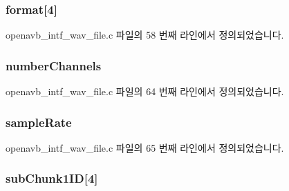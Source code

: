 \subsubsection[{\texorpdfstring{format}{format}}]{ format\mbox{[}4\mbox{]}}\hypertarget{structwav__file__header__t_ab12e770013967c7551505247b1a1fb47}{}\label{structwav__file__header__t_ab12e770013967c7551505247b1a1fb47}


openavb\+\_\+intf\+\_\+wav\+\_\+file.\+c 파일의 58 번째 라인에서 정의되었습니다.

\subsubsection[{\texorpdfstring{number\+Channels}{numberChannels}}]{ number\+Channels}\hypertarget{structwav__file__header__t_a5d53f987f62115b9a280f51b3eb6e518}{}\label{structwav__file__header__t_a5d53f987f62115b9a280f51b3eb6e518}


openavb\+\_\+intf\+\_\+wav\+\_\+file.\+c 파일의 64 번째 라인에서 정의되었습니다.

\subsubsection[{\texorpdfstring{sample\+Rate}{sampleRate}}]{ sample\+Rate}\hypertarget{structwav__file__header__t_a1c99108e33bb0042c03c3d211f34a611}{}\label{structwav__file__header__t_a1c99108e33bb0042c03c3d211f34a611}


openavb\+\_\+intf\+\_\+wav\+\_\+file.\+c 파일의 65 번째 라인에서 정의되었습니다.

\subsubsection[{\texorpdfstring{sub\+Chunk1\+ID}{subChunk1ID}}]{ sub\+Chunk1\+ID\mbox{[}4\mbox{]}}\hypertarget{structwav__file__header__t_aacd608a81c02223c50d5e96d6f327f4b}{}\label{structwav__file__header__t_aacd608a81c02223c50d5e96d6f327f4b}



